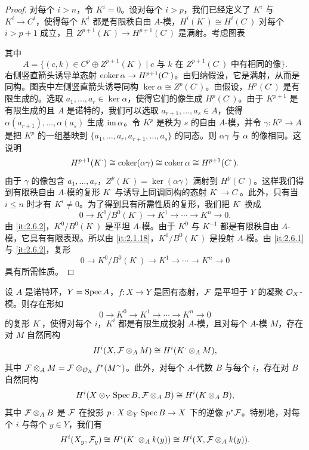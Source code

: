 \begin{proof}
对每个 $i>n$，令 $K^i=0$。设对每个 $i>p$，我们已经定义了 $K^i$ 与 $K^i\to C^i$，使得每个 $K^i$ 都是有限秩自由 $A$-模，$H^i(K^\cdot)\cong H^i(C^\cdot)$ 对每个 $i>p+1$ 成立，且 $Z^{p+1}(K^\cdot)\to H^{p+1}(C^\cdot)$ 是满射。考虑图表

\begin{center}
\end{center}

其中
\[
A=\{(c,k)\in C^p\oplus Z^{p+1}(K^\cdot)\mid c \text{ 与 } k \text{ 在 } Z^{p+1}(C^\cdot) \text{ 中有相同的像}\}.
\]
右侧竖直箭头诱导单态射 $\operatorname{coker}\alpha\to H^{p+1}(C^\cdot)$。由归纳假设，它是满射，从而是同构。图表中左侧竖直箭头诱导同构 $\ker\alpha\cong Z^p(C^\cdot)$。由假设，$H^p(C^\cdot)$ 是有限生成的。选取 $a_1,\dots,a_r\in\ker\alpha$，使得它们的像生成 $H^p(C^\cdot)$。由于 $K^{p+1}$ 是有限生成的且 $A$ 是诺特的，我们可以选取 $a_{r+1},\dots,a_s\in A$，使得 $\alpha(a_{r+1}),\dots,\alpha(a_s)$ 生成 $\operatorname{im}\alpha$。令 $K^p$ 是秩为 $s$ 的自由 $A$-模，并令 $\gamma\colon K^p\to A$ 是把 $K^p$ 的一组基映到 $\{a_1,\dots,a_r,a_{r+1},\dots,a_s\}$ 的同态。则 $\alpha\gamma$ 与 $\alpha$ 的像相同。这说明
\[
H^{p+1}(K^\cdot)\cong\operatorname{coker}(\alpha\gamma)\cong\operatorname{coker}\alpha\cong H^{p+1}(C^\cdot).
\]
由于 $\gamma$ 的像包含 $a_1,\dots,a_r$，$Z^p(K^\cdot)=\ker(\alpha\gamma)$ 满射到 $H^p(C^\cdot)$。这样我们得到有限秩自由 $A$-模的复形 $K^\cdot$ 与诱导上同调同构的态射 $K^\cdot\to C^\cdot$。此外，只有当 $i\le n$ 时才有 $K^i\ne 0$。为了得到具有所需性质的复形，我们把 $K^\cdot$ 换成
\[
0\to K^0/B^0(K^\cdot)\to K^1\to\cdots\to K^n\to 0.
\]
由 \ref{it:2.6.2}，$K^0/B^0(K^\cdot)$ 是平坦 $A$-模。由于 $K^0$ 与 $K^{-1}$ 都是有限秩自由 $A$-模，它具有有限表现。所以由 \ref{it:2.1.18}，$K^0/B^0(K^\cdot)$ 是投射 $A$-模。由 \ref{it:2.6.1} 与 \ref{it:2.6.2}，复形
\[
0\to K^0/B^0(K^\cdot)\to K^1\to\cdots\to K^n\to 0
\]
具有所需性质。
\end{proof}

\begin{proposition}\label{it:2.6.4}
设 $A$ 是诺特环，$Y=\operatorname{Spec} A$，$f\colon X\to Y$ 是固有态射，$\mathcal{F}$ 是平坦于 $Y$ 的凝聚 $\mathcal{O}_X$-模。则存在形如
\[
0\to K^0\to K^1\to\cdots\to K^n\to 0
\]
的复形 $K^\cdot$，使得对每个 $i$，$K^i$ 都是有限生成投射 $A$-模，且对每个 $A$-模 $M$，存在对 $M$ 自然同构
\[
H^i(X,\mathcal{F}\otimes_A M)\cong H^i(K^\cdot\otimes_A M),
\]
其中 $\mathcal{F}\otimes_A M=\mathcal{F}\otimes_{\mathcal{O}_X}f^*(M^\sim)$。此外，对每个 $A$-代数 $B$ 与每个 $i$，存在对 $B$ 自然同构
\[
H^i(X\otimes_Y\operatorname{Spec} B,\mathcal{F}\otimes_A B)\cong H^i(K\otimes_A B),
\]
其中 $\mathcal{F}\otimes_A B$ 是 $\mathcal{F}$ 在投影 $p\colon X\otimes_Y\operatorname{Spec} B\to X$ 下的逆像 $p^*\mathcal{F}$。特别地，对每个 $i$ 与每个 $y\in Y$，我们有
\[
H^i(X_y,\mathcal{F}_y)\cong H^i(K^\cdot\otimes_A k(y))\cong H^i(X,\mathcal{F}\otimes_A k(y)).
\]
\end{proposition}

